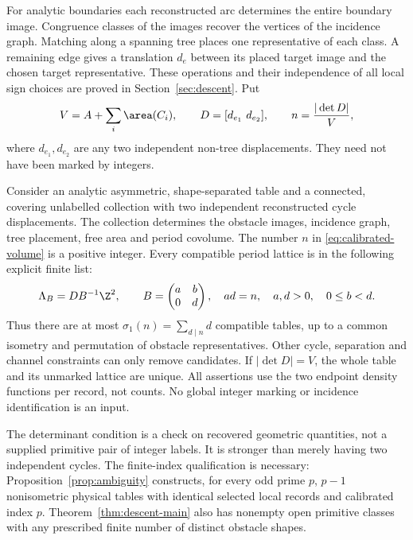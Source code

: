 For analytic boundaries each reconstructed arc determines the entire
boundary image. Congruence classes of the images recover the vertices
of the incidence graph. Matching along a spanning tree places one
representative of each class. A remaining edge gives a translation
$d_e$ between its placed target image and the chosen target representative.
These operations and their independence of all local sign choices are
proved in Section~\ref{sec:descent}. Put
\begin{equation}\label{eq:calibrated-volume}
 V=A+\sum_i\area(C_i),\qquad
 D=[d_{e_1}\ d_{e_2}],\qquad n=\frac{|\det D|}{V},
\end{equation}
where $d_{e_1},d_{e_2}$ are any two independent non-tree displacements.
They need not have been marked by integers.

\begin{theorem}\label{thm:descent-main}
Consider an analytic asymmetric, shape-separated table and a connected,
covering unlabelled collection with two independent reconstructed cycle
displacements. The collection determines the obstacle images, incidence
graph, tree placement, free area and period covolume. The number $n$
in \eqref{eq:calibrated-volume} is a positive integer. Every compatible
period lattice is in the following explicit finite list:
\begin{equation}\label{eq:hnf-main}
 \Lambda_B=DB^{-1}\Z^2,\qquad
 B=\begin{pmatrix}a&b\\0&d\end{pmatrix},\quad
 ad=n,\quad a,d>0,\quad 0\le b<d.
\end{equation}
Thus there are at most $\sigma_1(n)=\sum_{d\mid n}d$ compatible tables,
up to a common isometry and permutation of obstacle representatives.
Other cycle, separation and channel constraints can only remove candidates.
If $|\det D|=V$, the whole table and its unmarked lattice are unique.
All assertions use the two endpoint density functions per record, not
counts. No global integer marking or incidence identification is an input.
\end{theorem}

The determinant condition is a check on recovered geometric quantities,
not a supplied primitive pair of integer labels. It is stronger than
merely having two independent cycles. The finite-index qualification is
necessary: Proposition~\ref{prop:ambiguity} constructs, for every odd
prime $p$, $p-1$ nonisometric physical tables with identical selected
local records and calibrated index $p$. Theorem~\ref{thm:descent-main}
also has nonempty open primitive classes with any prescribed finite
number of distinct obstacle shapes.

